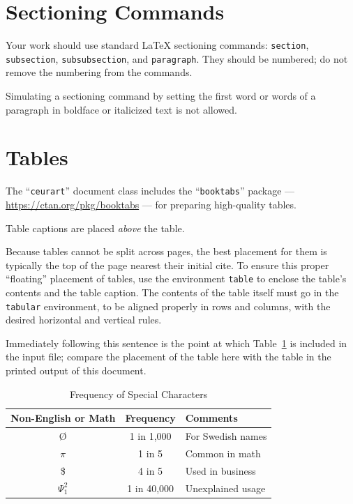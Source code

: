 \documentclass[
]{ceurart}
\begin{document}
\section{Sectioning Commands}

Your work should use standard \LaTeX{} sectioning commands:
\verb|section|, \verb|subsection|, \verb|subsubsection|, and
\verb|paragraph|. They should be numbered; do not remove the numbering
from the commands.

Simulating a sectioning command by setting the first word or words of
a paragraph in boldface or italicized text is not allowed.

\section{Tables}

The ``\verb|ceurart|'' document class includes the ``\verb|booktabs|''
package --- \url{https://ctan.org/pkg/booktabs} --- for preparing
high-quality tables.

Table captions are placed \textit{above} the table.

Because tables cannot be split across pages, the best placement for
them is typically the top of the page nearest their initial cite.  To
ensure this proper ``floating'' placement of tables, use the
environment \verb|table| to enclose the table's contents and the
table caption. The contents of the table itself must go in the
\verb|tabular| environment, to be aligned properly in rows and
columns, with the desired horizontal and vertical rules.

Immediately following this sentence is the point at which
Table~\ref{tab:freq} is included in the input file; compare the
placement of the table here with the table in the printed output of
this document.

\begin{table}
  \caption{Frequency of Special Characters}
  \label{tab:freq}
  \begin{tabular}{ccl}
    \toprule
    Non-English or Math&Frequency&Comments\\
    \midrule
    \O & 1 in 1,000& For Swedish names\\
    $\pi$ & 1 in 5& Common in math\\
    \$ & 4 in 5 & Used in business\\
    $\Psi^2_1$ & 1 in 40,000& Unexplained usage\\
  \bottomrule
\end{tabular}
\end{table}
\end{document}

